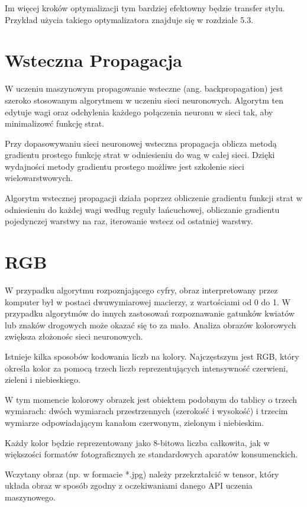 \documentclass[brudnopis]{xmgr}
\begin{document}
Im więcej kroków optymalizacji tym bardziej efektowny będzie transfer stylu.
Przykład użycia takiego optymalizatora znajduje się w rozdziale 5.3.

\section{Wsteczna Propagacja\label{s:dsssl}}

W uczeniu maszynowym propagowanie wsteczne (ang. backpropagation) jest szeroko stosowanym algorytmem w uczeniu sieci neuronowych. Algorytm ten edytuje wagi oraz odchylenia każdego połączenia neuronu w sieci tak, aby minimalizowć funkcję strat.

Przy dopasowywaniu sieci neuronowej wsteczna propagacja oblicza metodą gradientu prostego funkcję strat w odniesieniu do wag w całej sieci. Dzięki wydajności metody gradientu prostego możliwe jest szkolenie sieci wielowarstwowych.

Algorytm wstecznej propagacji działa poprzez obliczenie gradientu funkcji strat w odniesieniu do każdej wagi według reguły łańcuchowej, obliczanie gradientu pojedynczej warstwy na raz, iterowanie wstecz od ostatniej warstwy. 


 \section{RGB\label{s:dsssl}}
 
 W przypadku algorytmu rozpoznjającego cyfry, obraz interpretowany przez komputer był w postaci dwuwymiarowej macierzy, z wartościami od 0 do 1. W przypadku algorytmów do innych zastosowań rozpoznawanie gatunków kwiatów lub znaków drogowych może okazać się to za mało. Analiza obrazów kolorowych zwiększa złożonośc sieci neuronowych. 
 
Istnieje kilka sposobów kodowania liczb na kolory. Najczęstszym jest
RGB, który określa kolor za pomocą trzech liczb reprezentujących intensywność czerwieni, zieleni i niebieskiego. 

W tym momencie kolorowy obrazek jest obiektem podobnym do tablicy o trzech wymiarach: dwóch wymiarach przestrzennych (szerokość i wysokość) i trzecim wymiarze odpowiadającym kanałom czerwonym, zielonym i niebieskim. 

Każdy kolor będzie reprezentowany jako 8-bitowa liczba całkowita, jak w większości formatów fotograficznych ze standardowych aparatów konsumenckich.

Wczytany obraz (np. w formacie *.jpg) należy przekrztałcić w tensor, który układa obraz w sposób zgodny z oczekiwaniami danego API uczenia maszynowego.
\end{document}
